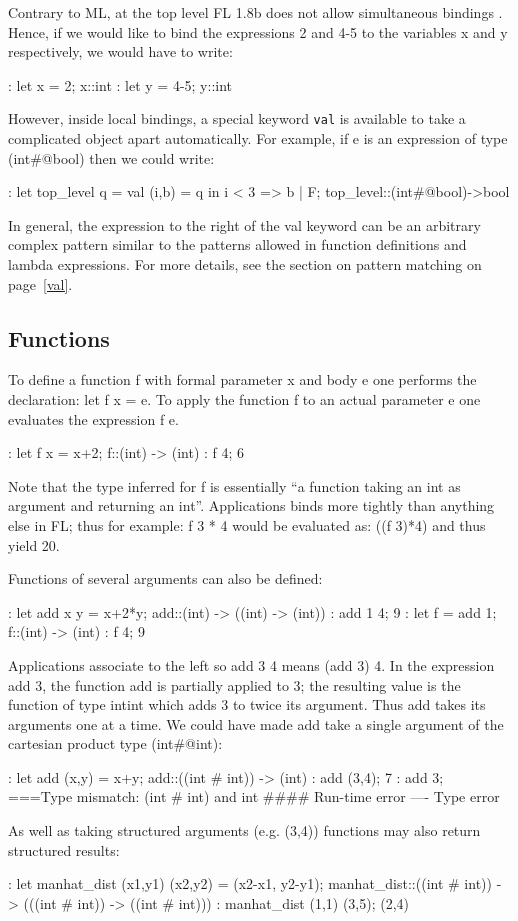 Contrary to ML, at the top level FL 1.8b does not allow
simultaneous bindings%
%
{}.
Hence, if we would like to bind the expressions 2 and 4-5 to the
variables x and y respectively, we would have to write:
\begin{hol}
: let x = 2;
x::int
: let y = 4-5;
y::int
\end{hol}
However, inside local bindings, a special keyword {\tt val}
%
{}
is available to take a complicated object apart automatically.
For example, if e is an expression of type (int\verb@#@bool) then
we could write:
\begin{hol}
: let top\_level q =
	val (i,b) = q in
	i < 3 => b | F;
top\_level::(int\verb@#@bool)->bool
\end{hol}
In general, the expression to the right of the val keyword
can be an arbitrary complex pattern similar to the patterns%
%
{}
allowed in function definitions and lambda expressions.
For more details, see the section on pattern matching on page~\ref{val}.

\subsection{Functions}

To define a function%
%
{} f with formal parameter x and body e one performs
the declaration: let f x = e.
To apply the function f to an actual parameter e one evaluates
the expression f e.
\begin{hol}
: let f x = x+2;
f::(int) -> (int)
: f 4;
6
\end{hol}
Note that the type inferred for f is essentially ``a function taking
an int as argument and returning an int''.
Applications binds more tightly than anything else in FL; thus for example:
f 3 * 4 would be evaluated as: ((f 3)*4) and thus yield 20.

Functions of several arguments can also be defined:
\begin{hol}
: let add x y = x+2*y;
add::(int) -> ((int) -> (int))
: add 1 4;
9
: let f = add 1;
f::(int) -> (int)
: f 4;
9
\end{hol}
Applications associate%
%
{} to the left so add 3 4 means (add 3) 4. In the
expression add 3, the
function add is partially applied to 3; the resulting value is the
function of type int\funarrow int which
adds 3 to twice its argument. Thus add takes its arguments one at a time.
We could have made add take a single argument of the cartesian product%
%
{}
type (int\verb@#@int):
\begin{hol}
: let add (x,y) = x+y;
add::((int # int)) -> (int)
: add (3,4);
7
: add 3;
===Type mismatch: (int # int) and int
#### Run-time error
---- Type error
\end{hol}
As well as taking structured arguments (e.g. (3,4)) functions may also return
structured results:
\begin{hol}
: let manhat\_dist (x1,y1) (x2,y2) = (x2-x1, y2-y1);
manhat\_dist::((int # int)) -> (((int # int)) -> ((int # int)))
: manhat\_dist (1,1) (3,5);
(2,4)
\end{hol}

